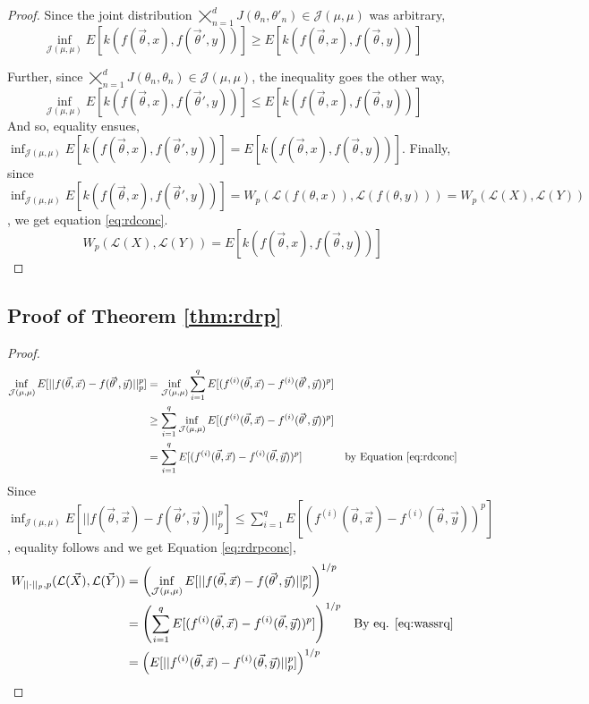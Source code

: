 \documentclass[12pt]{article}
\theoremstyle{plain}%
\theoremstyle{definition}
\begin{document}
\begin{proof}
	Since the joint distribution $\bigtimes_{n=1}^d J(\theta_n,\theta'_{n})\in \mathcal{J}(\mu,\mu)$ was arbitrary, 
	$$\inf_{ \mathcal{J}(\mu,\mu)}E[k(f( \vec{\theta},x),f(\vec{\theta}',y))]\geq E[k(f( \vec{\theta},x),f(\vec{\theta},y))]$$
	
	Further, since $\bigtimes_{n=1}^d J(\theta_n,\theta_n)\in \mathcal{J}(\mu,\mu)$, the inequality goes the other way,
	$$\inf_{  \mathcal{J}(\mu,\mu)}E[k(f( \vec{\theta},x),f(\vec{\theta}',y))]\leq E[k(f( \vec{\theta},x),f(\vec{\theta},y))]$$
	And so, equality ensues, 
	$\inf_{ \mathcal{J}(\mu,\mu)}E[k(f( \vec{\theta},x),f(\vec{\theta}',y))]= E[k(f( \vec{\theta},x),f(\vec{\theta},y))]$.
	Finally, since $\inf_{ \mathcal{J}(\mu,\mu) }E[k(f( \vec{\theta},x),f(\vec{\theta}',y))]=W_p(\mathcal{L}(f(\theta,x)),\mathcal{L}(f(\theta,y)))=W_p(\mathcal{L}(X),\mathcal{L}(Y))$, we get equation \ref{eq:rdconc}.
	$$	W_p(\mathcal{L}(X), \mathcal{L}(Y))=
	E[k(f(\vec{\theta},x),f(\vec{\theta},y))]$$
\end{proof}
	
	\subsection{Proof of Theorem \ref{thm:rdrp}}\label{pf:rdrp}
	\begin{proof}
		\begin{align}\label{eq:wassrq}
			\inf_{\mathcal{J}(\mu,\mu)}E[||f(\vec{\theta},\vec{x})-f(\vec{\theta}',\vec{y})||_p^p]&=\inf_{\mathcal{J}(\mu,\mu)} \sum_{i=1}^q E[(f^{(i)}(\vec{\theta},\vec{x})-f^{(i)}(\vec{\theta}',\vec{y}))^p]\\
			&\geq\sum_{i=1}^q \inf_{\mathcal{J}(\mu,\mu)}  E[(f^{(i)}(\vec{\theta},\vec{x})-f^{(i)}(\vec{\theta}',\vec{y}))^p]\\
			&=\sum_{i=1}^q  E[(f^{(i)}(\vec{\theta},\vec{x})-f^{(i)}(\vec{\theta},\vec{y}))^p]&\text{by Equation \ref{eq:rdconc}}
		\end{align}
		Since $\inf_{\mathcal{J}(\mu,\mu)}E[||f(\vec{\theta},\vec{x})-f(\vec{\theta}',\vec{y})||_p^p]\leq \sum_{i=1}^q  E[(f^{(i)}(\vec{\theta},\vec{x})-f^{(i)}(\vec{\theta},\vec{y}))^p]$,
		equality follows and we get Equation \ref{eq:rdrpconc},
		\begin{align*}
			W_{||\cdot||_p,p}(\mathcal{L}(\vec{X}), \mathcal{L}(\vec{Y}))&=\left(\inf_{\mathcal{J}(\mu,\mu)}E[||f(\vec{\theta},\vec{x})-f(\vec{\theta}',\vec{y})||_p^p]\right)^{1/p}\\
			&= \left( \sum_{i=1}^qE[(f^{(i)}(\vec{\theta},\vec{x})-f^{(i)}(\vec{\theta},\vec{y}))^p]\right)^{1/p}&\text{By eq. \ref{eq:wassrq}}\\
			&=\left( E[||f^{(i)}(\vec{\theta},\vec{x})-f^{(i)}(\vec{\theta},\vec{y})||_p^p]\right)^{1/p}\\
		\end{align*}
	\end{proof}
	\newpage
\end{document}
